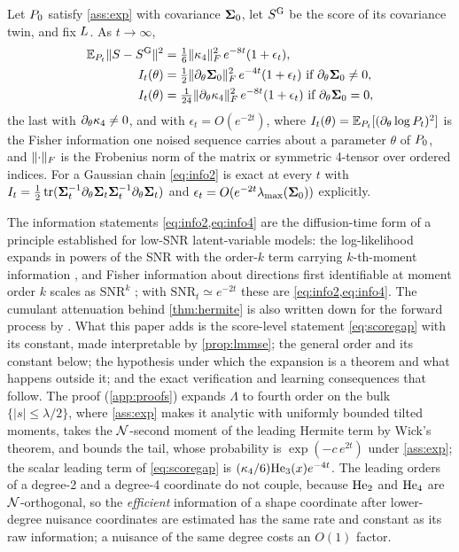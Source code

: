 \begin{theorem}
\label{thm:decay}
Let $P_0$ satisfy \cref{ass:exp} with covariance $\mathbf{\Sigma}_0$, let $S^{\mathrm{G}}$ be the score
of its covariance twin, and fix $L$. As $t\to\infty$,
\begin{align}
  \mathbb{E}_{P_t}\lVert S-S^{\mathrm{G}}\rVert^2
   &= \tfrac{1}{6}\lVert \kappa_4 \rVert_{F}^2\,e^{-8t}(1+\epsilon_t),
  \label{eq:scoregap}\\
  I_t(\theta)&= \tfrac12\lVert \partial_\theta\mathbf{\Sigma}_0 \rVert_{F}^2\,e^{-4t}(1+\epsilon_t)
  \ \text{if }\partial_\theta\mathbf{\Sigma}_0\neq0,
  \label{eq:info2}\\
  I_t(\theta)&= \tfrac1{24}\lVert \partial_\theta\kappa_4 \rVert_{F}^2\,e^{-8t}(1+\epsilon_t)
  \ \text{if }\partial_\theta\mathbf{\Sigma}_0=0,
  \label{eq:info4}
\end{align}
the last with $\partial_\theta\kappa_4\neq0$, and with $\epsilon_t=O(e^{-2t})$,
where $I_t(\theta)=\mathbb{E}_{P_t}[(\partial_\theta\log P_t)^2]$ is the Fisher information one
noised sequence carries about a parameter $\theta$ of $P_0$, and $\lVert \cdot \rVert_{F}$ is the
Frobenius norm of the matrix or symmetric 4-tensor over ordered indices. For a Gaussian
chain \cref{eq:info2} is exact at every $t$ with
$I_t=\tfrac12\operatorname{tr}(\mathbf{\Sigma}_t^{-1}\partial_\theta\mathbf{\Sigma}_t\mathbf{\Sigma}_t^{-1}\partial_\theta\mathbf{\Sigma}_t)$
and $\epsilon_t=O(e^{-2t}\lambda_{\max}(\mathbf{\Sigma}_0))$ explicitly.
\end{theorem}
The information statements \cref{eq:info2,eq:info4} are the diffusion-time form of a
principle established for low-SNR latent-variable models: the log-likelihood expands in
powers of the SNR with the order-$k$ term carrying $k$-th-moment information
\citep{katsevich2023likelihood,perry2019sample,bandeira2023estimation}, and Fisher
information about directions first identifiable at moment order $k$ scales as
$\mathrm{SNR}^k$ \citep{balanov2026gmm}; with $\mathrm{SNR}_t\simeq e^{-2t}$ these are
\cref{eq:info2,eq:info4}. The cumulant attenuation behind \cref{thm:hermite} is also
written down for the forward process by \citet{aarts2025cumulants}. What this paper
adds is the score-level statement \cref{eq:scoregap} with its constant, made
interpretable by \cref{prop:lmmse}; the general order and its constant below; the
hypothesis under which the expansion is a theorem and what happens outside it; and the
exact verification and learning consequences that follow. The proof
(\cref{app:proofs}) expands $\Lambda$ to fourth order on the bulk $\{|s|\le\lambda/2\}$,
where \cref{ass:exp} makes it analytic with uniformly bounded tilted moments, takes the
$\mathcal{N}$-second moment of the leading Hermite term by Wick's theorem, and bounds the
tail, whose probability is $\exp(-c\,e^{2t})$ under \cref{ass:exp}; the scalar leading
term of \cref{eq:scoregap} is $(\kappa_4/6)\mathrm{He}_{3}(x)e^{-4t}$. The leading orders of a
degree-2 and a degree-4 coordinate do not couple, because $\mathrm{He}_{2}$ and $\mathrm{He}_{4}$ are
$\mathcal{N}$-orthogonal, so the \emph{efficient} information of a shape coordinate after
lower-degree nuisance coordinates are estimated has the same rate and constant as its
raw information; a nuisance of the same degree costs an $O(1)$ factor.

